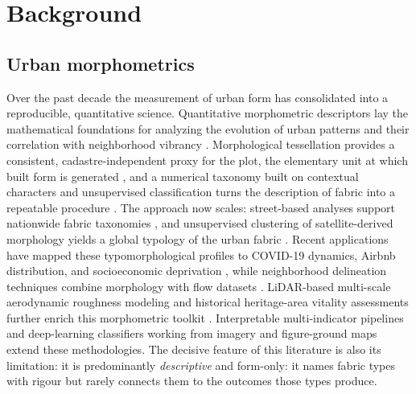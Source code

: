 \section{Background}
\label{sec:background}

\subsection{Urban morphometrics}
\label{sec:bg-morphometrics}
Over the past decade the measurement of urban form has consolidated into a
reproducible, quantitative science. Quantitative morphometric descriptors lay the
mathematical foundations for analyzing the evolution of urban patterns and their
correlation with neighborhood vibrancy \citep{dibble2019OriginSpaces,
fleischmann2021MeasurinUrban, lu2019ExplorinAssociat}. Morphological tessellation
provides a consistent, cadastre-independent proxy for the plot, the elementary
unit at which built form is generated \citep{fleischmann2020Morphologic}, and a
numerical taxonomy built on contextual characters and unsupervised classification
turns the description of fabric into a repeatable procedure
\citep{fleischmann2022MethodolFoundati}. The approach now scales: street-based
analyses support nationwide fabric taxonomies \citep{araldi2025MultiLevel}, and
unsupervised clustering of satellite-derived morphology yields a global typology
of the urban fabric \citep{debray2025UniversalPatterns}. Recent applications have
mapped these typomorphological profiles to COVID-19 dynamics, Airbnb distribution,
and socioeconomic deprivation \citep{venerandi2023UrbanForm, venerandi2023UrbanFormb,
venerandi2024UrbanForm}, while neighborhood delineation techniques combine morphology
with flow datasets \citep{govind2024DelineatNeighbor}. LiDAR-based multi-scale
aerodynamic roughness modeling and historical heritage-area vitality assessments
further enrich this morphometric toolkit \citep{an2024StudyMorphome,
wu2022CultivatHistoric}. Interpretable multi-indicator pipelines
\citep{vartholomaios2025Detection} and deep-learning classifiers working from
imagery and figure-ground maps \citep{fang2024Urbanclassifier,
wangJ2024FigureGround} extend these methodologies. The decisive feature of this
literature is also its limitation: it is predominantly \emph{descriptive} and
form-only: it names fabric types with rigour but rarely connects them to the
outcomes those types produce.

